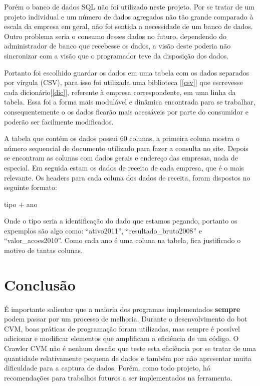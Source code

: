 \documentclass[a4paper, 12pt]{article}
\begin{document}
Porém o banco de dados SQL não foi utilizado neste projeto. Por se
tratar de um projeto individual e um número de dados agregados não tão
grande comparado à escala da empresa em geral, não foi sentida a
necessidade de um banco de dados. Outro problema seria o consumo
desses dados no futuro, dependendo do administrador de banco que
recebesse os dados, a visão deste poderia não sincronizar com a visão
que o programador teve da disposição dos dados.

Portanto foi escolhido guardar os dados em uma tabela com os dados
separados por vírgula (CSV), para isso foi utilizada uma biblioteca [\ref{csv}]
que escrevesse cada dicionário[\ref{dic}], referente à empresa
correspondente, em uma linha da tabela. Essa foi a forma mais
modulável e dinâmica encontrada para se trabalhar, consequentemente o
os dados ficarão mais acessáveis por parte do consumidor e poderão ser
facilmente modificados.

A tabela que contém os dados possui 60 colunas, a primeira coluna
mostra o número sequencial de documento utilizado para fazer a
consulta no site. Depois se encontram as colunas com dados gerais e
endereço das empresas, nada de especial. Em seguida estam os dados de
receita de cada empresa, que é o mais relevante. Os headers para cada
coluna dos dados de receita, foram dispostos no seguinte formato:
\begin{center}
 tipo + ano
\end{center}

Onde o tipo seria a identificação do dado que estamos pegando,
portanto os expemplos são algo como: ``ativo2011'',
``resultado\_bruto2008'' e ``valor\_acoes2010''. Como cada ano é uma
coluna na tabela, fica justificado o motivo de tantas colunas.

\section{Conclusão}\label{conclusions}
\paragraph{}É importante salientar que a maioria dos programas
implementados {\bf sempre} podem passar por um processo de melhoria.
Durante o desenvolvimento do bot CVM, boas práticas de programação
foram utilizadas, mas sempre é possível adicionar e modificar
elementos que amplificam a eficiência de um código. O Crawler CVM não
é nenhum desafio que teste esta eficiência por se tratar de uma
quantidade relativamente pequena de dados e também por não apresentar
muita dificuldade para a captura de dados. Porém, como todo projeto,
há recomendações para trabalhos futuros a ser implementados na
ferramenta.
\end{document}
